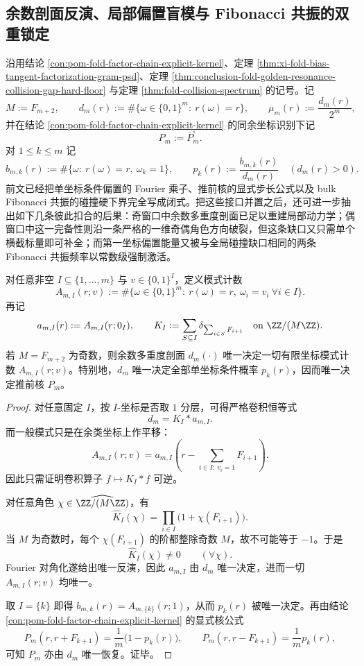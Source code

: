\subsection{余数剖面反演、局部偏置盲模与 Fibonacci 共振的双重锁定}\label{subsec:conclusion-residue-local-bias-kernel-blindmode-resonance}
沿用结论 \ref{con:pom-fold-factor-chain-explicit-kernel}、定理 \ref{thm:xi-fold-bias-tangent-factorization-gram-psd}、定理 \ref{thm:conclusion-fold-golden-resonance-collision-gap-hard-floor} 与定理 \ref{thm:fold-collision-spectrum} 的记号。记
\[
M:=F_{m+2},
\qquad
d_m(r):=\#\{\omega\in\{0,1\}^m:\ r(\omega)=r\},
\qquad
\mu_m(r):=\frac{d_m(r)}{2^m},
\]
并在结论 \ref{con:pom-fold-factor-chain-explicit-kernel} 的同余坐标识别下记
\[
P_m:=\overline P_m^{\square}.
\]
对 \(1\le k\le m\) 记
\[
b_{m,k}(r):=\#\{\omega:\ r(\omega)=r,\ \omega_k=1\},
\qquad
p_k(r):=\frac{b_{m,k}(r)}{d_m(r)}
\quad (d_m(r)>0).
\]
前文已经把单坐标条件偏置的 Fourier 乘子、推前核的显式步长公式以及 bulk Fibonacci 共振的碰撞硬下界完全写成闭式。把这些接口并置之后，还可进一步抽出如下几条彼此扣合的后果：奇窗口中余数多重度剖面已足以重建局部动力学；偶窗口中这一完备性则沿一条严格的一维奇偶角色方向破裂，但这条缺口又只需单个横截标量即可补全；而第一坐标偏置能量又被与全局碰撞缺口相同的两条 Fibonacci 共振频率以常数级强制激活。

\begin{theorem}[奇窗口上的有限坐标约束完全反演]\label{thm:conclusion-residue-local-statistics-complete-reconstruction}
对任意非空 \(I\subseteq\{1,\dots,m\}\) 与 \(v\in\{0,1\}^{I}\)，定义模式计数
\[
A_{m,I}(r;v)
:=
\#\{\omega\in\{0,1\}^m:\ r(\omega)=r,\ \omega_i=v_i\ \forall i\in I\}.
\]
再记
\[
a_{m,I}(r):=A_{m,I}(r;0_I),
\qquad
K_I:=\sum_{S\subseteq I}\delta_{\sum_{i\in S}F_{i+1}}
\quad\text{on }\ZZ/(M\ZZ).
\]
若 \(M=F_{m+2}\) 为奇数，则余数多重度剖面 \(d_m(\cdot)\) 唯一决定一切有限坐标模式计数 \(A_{m,I}(r;v)\)。特别地，\(d_m\) 唯一决定全部单坐标条件概率 \(p_k(r)\)，因而唯一决定推前核 \(P_m\)。
\end{theorem}
\begin{proof}
对任意固定 \(I\)，按 \(I\)-坐标是否取 \(1\) 分层，可得严格卷积恒等式
\[
d_m=K_I*a_{m,I}.
\]
而一般模式只是在余类坐标上作平移：
\[
A_{m,I}(r;v)
=
a_{m,I}\!\left(r-\sum_{i\in I:\ v_i=1}F_{i+1}\right).
\]
因此只需证明卷积算子 \(f\mapsto K_I*f\) 可逆。

对任意角色 \(\chi\in \widehat{\ZZ/(M\ZZ)}\)，有
\[
\widehat K_I(\chi)=\prod_{i\in I}\bigl(1+\chi(F_{i+1})\bigr).
\]
当 \(M\) 为奇数时，每个 \(\chi(F_{i+1})\) 的阶都整除奇数 \(M\)，故不可能等于 \(-1\)。于是
\[
\widehat K_I(\chi)\neq 0
\qquad (\forall \chi).
\]
Fourier 对角化遂给出唯一反演，因此 \(a_{m,I}\) 由 \(d_m\) 唯一决定，进而一切 \(A_{m,I}(r;v)\) 均唯一。

取 \(I=\{k\}\) 即得 \(b_{m,k}(r)=A_{m,\{k\}}(r;1)\)，从而 \(p_k(r)\) 被唯一决定。再由结论 \ref{con:pom-fold-factor-chain-explicit-kernel} 的显式核公式
\[
P_m(r,r+F_{k+1})=\frac{1}{m}\bigl(1-p_k(r)\bigr),
\qquad
P_m(r,r-F_{k+1})=\frac{1}{m}p_k(r),
\]
可知 \(P_m\) 亦由 \(d_m\) 唯一恢复。证毕。
\end{proof}

